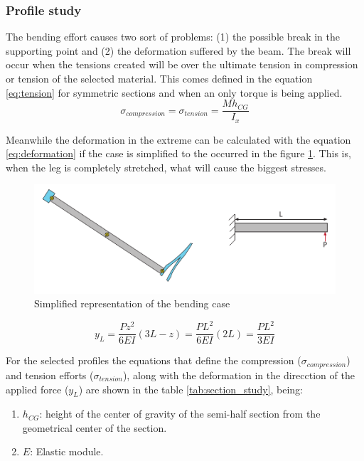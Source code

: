 \subsubsection{Profile study} %
\label{ssub:profile_study}
  The bending effort causes two sort of problems: (1) the possible break in the supporting point and (2) the deformation suffered by the beam.
  The break will occur when the tensions created will be over the ultimate tension in compression or tension of the selected material.
  This comes defined in the equation \ref{eq:tension} for symmetric sections and when an only torque is being applied.
  \begin{equation}
  \label{eq:tension}
    \sigma _{compression} = \sigma _{tension} = \frac{M h_{CG}}{I_x}
  \end{equation}

  Meanwhile the deformation in the extreme can be calculated with the equation \ref{eq:deformation} if the case is simplified to the occurred in the figure \ref{fig:bending_case}.
  This is, when the leg is completely stretched, what will cause the biggest stresses.

  \begin{figure}[ht!]
    \centering
    \includegraphics[width=\textwidth]{figures/bending_case.pdf}
    \caption{Simplified representation of the bending case}
    \label{fig:bending_case}
  \end{figure}

  \begin{equation}
  \label{eq:deformation}
    y_L = \frac{P z^2}{6EI}(3L-z) = \frac{P L^2}{6EI}(2L) = \frac{P L^2}{3EI}
  \end{equation}


  For the selected profiles the equations that define the compression ($\sigma _{compression}$) and tension efforts ($\sigma _{tension}$), along with the deformation in the direcction of the applied force ($y_L$) are shown in the table \ref{tab:section_study}, being:

  \begin{enumerate}
    \item $h_{CG}$: height of the center of gravity of the semi-half section from the geometrical center of the section.

    \item $E$: Elastic module.
  \end{enumerate}

